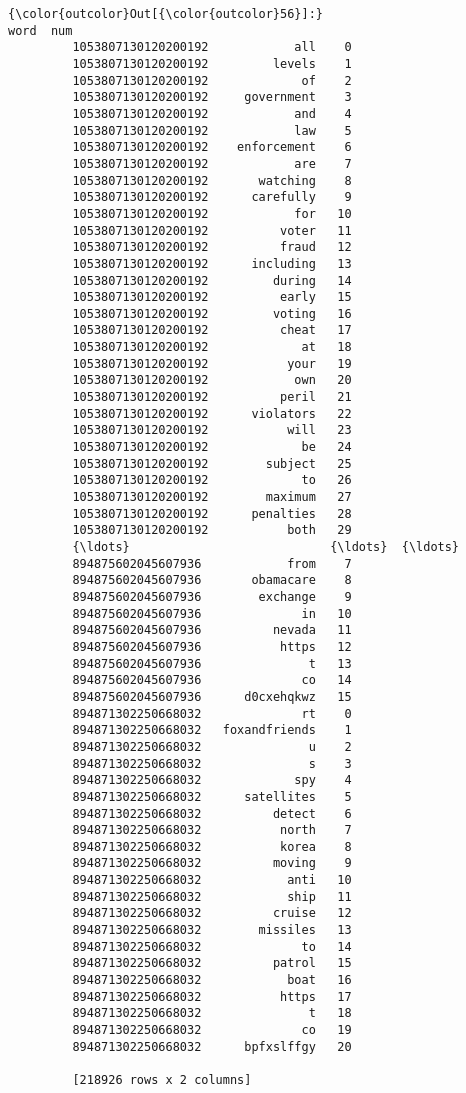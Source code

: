 \documentclass[11pt]{article}
\begin{document}
\begin{Verbatim}[commandchars=\\\{\}]
{\color{outcolor}Out[{\color{outcolor}56}]:}                               word  num
         1053807130120200192            all    0
         1053807130120200192         levels    1
         1053807130120200192             of    2
         1053807130120200192     government    3
         1053807130120200192            and    4
         1053807130120200192            law    5
         1053807130120200192    enforcement    6
         1053807130120200192            are    7
         1053807130120200192       watching    8
         1053807130120200192      carefully    9
         1053807130120200192            for   10
         1053807130120200192          voter   11
         1053807130120200192          fraud   12
         1053807130120200192      including   13
         1053807130120200192         during   14
         1053807130120200192          early   15
         1053807130120200192         voting   16
         1053807130120200192          cheat   17
         1053807130120200192             at   18
         1053807130120200192           your   19
         1053807130120200192            own   20
         1053807130120200192          peril   21
         1053807130120200192      violators   22
         1053807130120200192           will   23
         1053807130120200192             be   24
         1053807130120200192        subject   25
         1053807130120200192             to   26
         1053807130120200192        maximum   27
         1053807130120200192      penalties   28
         1053807130120200192           both   29
         {\ldots}                            {\ldots}  {\ldots}
         894875602045607936            from    7
         894875602045607936       obamacare    8
         894875602045607936        exchange    9
         894875602045607936              in   10
         894875602045607936          nevada   11
         894875602045607936           https   12
         894875602045607936               t   13
         894875602045607936              co   14
         894875602045607936      d0cxehqkwz   15
         894871302250668032              rt    0
         894871302250668032   foxandfriends    1
         894871302250668032               u    2
         894871302250668032               s    3
         894871302250668032             spy    4
         894871302250668032      satellites    5
         894871302250668032          detect    6
         894871302250668032           north    7
         894871302250668032           korea    8
         894871302250668032          moving    9
         894871302250668032            anti   10
         894871302250668032            ship   11
         894871302250668032          cruise   12
         894871302250668032        missiles   13
         894871302250668032              to   14
         894871302250668032          patrol   15
         894871302250668032            boat   16
         894871302250668032           https   17
         894871302250668032               t   18
         894871302250668032              co   19
         894871302250668032      bpfxslffgy   20
         
         [218926 rows x 2 columns]
\end{Verbatim}
            
\end{document}
